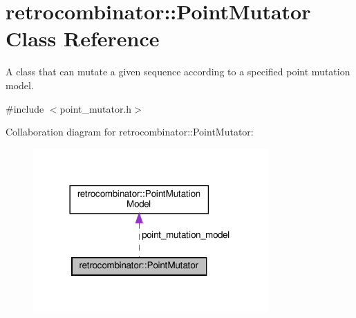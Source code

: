 \hypertarget{classretrocombinator_1_1PointMutator}{}\section{retrocombinator\+:\+:Point\+Mutator Class Reference}
\label{classretrocombinator_1_1PointMutator}


A class that can mutate a given sequence according to a specified point mutation model.  




{\ttfamily \#include $<$point\+\_\+mutator.\+h$>$}



Collaboration diagram for retrocombinator\+:\+:Point\+Mutator\+:\nopagebreak
\begin{figure}[H]
\begin{center}
\leavevmode
\includegraphics[width=254pt]{classretrocombinator_1_1PointMutator__coll__graph}
\end{center}
\end{figure}
